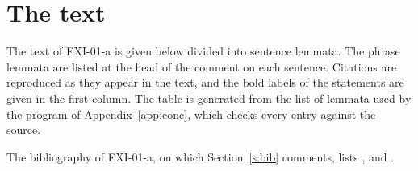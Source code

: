 \section{The text}\label{s:text}

The text of EXI-01-a is given below divided into sentence lemmata. The phrase lemmata are listed at the head of the comment on each sentence. Citations are reproduced as they appear in the text, and the bold labels of the statements are given in the first column. The table is generated from the list of lemmata used by the program of Appendix~\ref{app:conc}, which checks every entry against the source.

{\small}

The bibliography of EXI-01-a, on which Section~\ref{s:bib} comments, lists \citet{Metz2013}, \citet{Nagel1971} and \citet{Wolf2010}.

